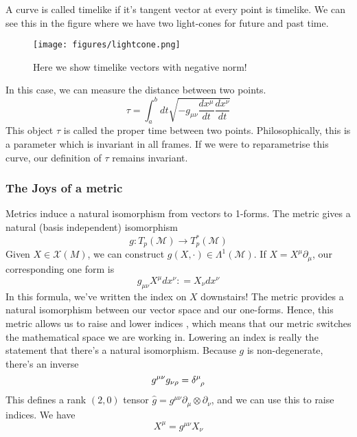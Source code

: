 A curve is called timelike if it's tangent 
vector at every point is timelike. We can see this in the figure 
where we have two light-cones for future and past time. 
\begin{figure}[h]
	\centering
	\hspace*{3cm}\texttt{[image: figures/lightcone.png]}
	\caption{Here we show timelike vectors with negative norm!}%
	\label{fig:figures / lightcones}
\end{figure}
In this case, we can measure the distance between two points. 
\[
\tau = \int_{ a} ^ b dt \sqrt{  - g_{ \mu \nu } \frac{dx^ \mu }{ dt } \frac{ dx ^ \nu }{ dt }} 
\] This object $ \tau $ is called the proper time 
between two points. Philosophically, this is a parameter which is 
invariant in all frames. 
If we were to reparametrise this curve, our 
definition of $ \tau $ remains invariant. 

\subsubsection{The Joys of a metric}

\begin{claim}{Metrics induce a natural isomorphism from vectors to 1-forms.} 
The metric gives a natural (basis independent) isomorphism 
\[
g : T_p ( \mathcal{ M }) \to T_p ^ * ( \mathcal{ M } ) 
\] Given $ X \in \mathcal{ X } \left( M  \right) $, we can construct 
$ g ( X , \cdot  ) \in \Lambda^ 1 ( \mathcal{ M }) $. 
If $ X = X^ \mu \partial _ \mu $, our corresponding one form is 
\[
g_{ \mu \nu } X^ \mu dx^ \nu : = X_\nu dx^ \nu 
\] In this formula, we've written the index on $ X $ downstairs!
The metric provides a natural isomorphism between 
our vector space and our one-forms. Hence, 
this metric allows us to raise and lower indices ,
which means that our metric switches the mathematical space 
we are working in. 
Lowering an index is really the statement that there's a natural 
isomorphism. 
Because $ g $ is non-degenerate, there's an inverse
\[
g ^{ \mu \nu } g _{ \nu \rho } = \delta \indices{ ^ \mu _ \rho } 
\] This defines a rank $ ( 2, 0 ) $ tensor $ \hat{g} = g^{ \mu \nu } \partial  _\mu \otimes \partial  _ \nu  $, and 
we can use this to raise indices. We have 
\[
X^\mu = g ^{ \mu \nu } X_ \nu  
\]
\end{claim} 

